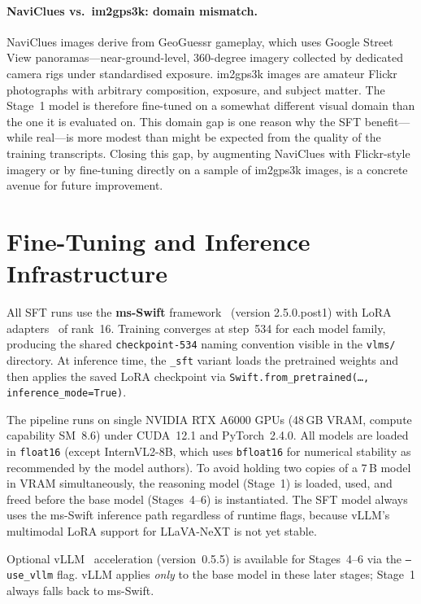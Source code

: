 \documentclass[11pt]{article}
\begin{document}
\paragraph{NaviClues vs.\ im2gps3k: domain mismatch.}
NaviClues images derive from GeoGuessr gameplay, which uses Google Street View
panoramas---near-ground-level, 360-degree imagery collected by dedicated camera
rigs under standardised exposure. im2gps3k images are amateur Flickr photographs
with arbitrary composition, exposure, and subject matter. The Stage~1 model is
therefore fine-tuned on a somewhat different visual domain than the one it is
evaluated on. This domain gap is one reason why the SFT benefit---while real---is
more modest than might be expected from the quality of the training transcripts.
Closing this gap, by augmenting NaviClues with Flickr-style imagery or by
fine-tuning directly on a sample of im2gps3k images, is a concrete avenue for
future improvement.

\section{Fine-Tuning and Inference Infrastructure}
\label{sec:infra}

All SFT runs use the \textbf{ms-Swift} framework~\citep{msSwift2024} (version 2.5.0.post1)
with LoRA adapters~\citep{Hu2022LoRA} of rank~16. Training converges at step~534 for each
model family, producing the shared \texttt{checkpoint-534} naming convention visible in
the \texttt{vlms/} directory. At inference time, the \texttt{\_sft} variant loads the
pretrained weights and then applies the saved LoRA checkpoint via
\texttt{Swift.from\_pretrained(\ldots, inference\_mode=True)}.

The pipeline runs on single NVIDIA RTX A6000 GPUs (48\,GB VRAM, compute capability SM~8.6)
under CUDA~12.1 and PyTorch~2.4.0. All models are loaded in \texttt{float16} (except
InternVL2-8B, which uses \texttt{bfloat16} for numerical stability as recommended by the
model authors). To avoid holding two copies of a 7\,B model in VRAM simultaneously, the
reasoning model (Stage~1) is loaded, used, and freed before the base model (Stages~4--6)
is instantiated. The SFT model always uses the ms-Swift inference path regardless of
runtime flags, because vLLM's multimodal LoRA support for LLaVA-NeXT is not yet stable.

Optional vLLM~\citep{Kwon2023vLLM} acceleration (version~0.5.5) is available for
Stages~4--6 via the \texttt{--use\_vllm} flag. vLLM applies \emph{only} to the base model
in these later stages; Stage~1 always falls back to ms-Swift.
\end{document}

